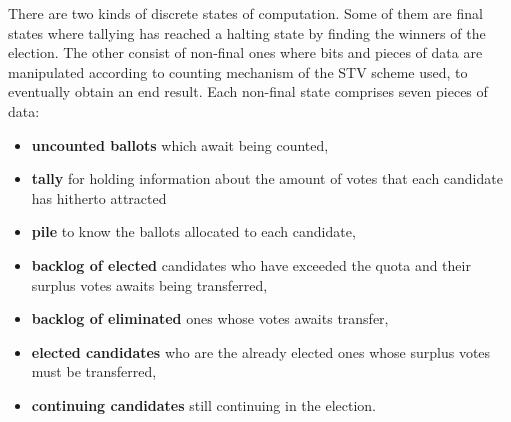 \documentclass[10pt,conference]{IEEEtran}
\begin{document}
There are two kinds of discrete states of computation. Some of them are final states where tallying has reached a halting state by finding the winners of the election. The other consist of non-final ones where bits and pieces of data are manipulated according to counting mechanism of the STV scheme used, to eventually obtain an end result. Each non-final state comprises seven pieces of data: 
\begin{itemize}
 \item\textbf{uncounted ballots} which await being counted,
 \item\textbf{tally} for holding information about the amount of votes that each candidate has hitherto attracted %
 \item\textbf{pile} to know the ballots allocated to each candidate, 
 \item\textbf{backlog of elected} candidates who have exceeded the quota and their surplus votes awaits being transferred,
 \item\textbf{backlog of eliminated} ones whose votes awaits transfer,
 \item\textbf{elected candidates} who are the already elected ones whose surplus votes must be transferred,
 \item\textbf{continuing candidates} still continuing in the election. 
 \end{itemize}
\end{document}
